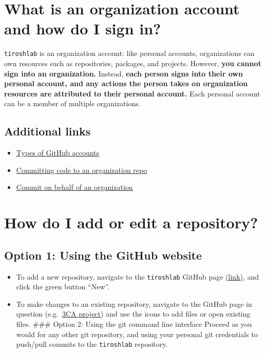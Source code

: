 \documentclass[
]{book}
\providecommand{\tightlist}{%
  \setlength{\itemsep}{0pt}\setlength{\parskip}{0pt}}
\begin{document}
\hypertarget{what-is-an-organization-account-and-how-do-i-sign-in}{%
\section{What is an organization account and how do I sign in?}\label{what-is-an-organization-account-and-how-do-i-sign-in}}

\texttt{tiroshlab} is an organization account: like personal accounts, organizations can own resources such as repositories, packages, and projects. However, \textbf{you cannot sign into an organization.} Instead, \textbf{each person signs into their own personal account, and any actions the person takes on organization resources are attributed to their personal account.} Each personal account can be a member of multiple organizations.

\hypertarget{additional-links}{%
\subsection{Additional links}\label{additional-links}}

\begin{itemize}
\tightlist
\item
  \href{https://docs.github.com/en/get-started/learning-about-github/types-of-github-accounts}{Types of GitHub accounts}
\item
  \href{https://stackoverflow.com/questions/35745358/can-a-github-organization-commit-code-to-a-repository}{Committing code to an organization repo}
\item
  \href{Creating\%20a\%20commit\%20on\%20behalf\%20of\%20an\%20organization}{Commit on behalf of an organization}
\end{itemize}

\hypertarget{how-do-i-add-or-edit-a-repository}{%
\section{How do I add or edit a repository?}\label{how-do-i-add-or-edit-a-repository}}

\hypertarget{option-1-using-the-github-website}{%
\subsection{Option 1: Using the GitHub website}\label{option-1-using-the-github-website}}

\begin{itemize}
\tightlist
\item
  To add a new repository, navigate to the \texttt{tiroshlab} GitHub page \href{https://github.com/tiroshlab}{(link)}, and click the green button ``New''.
\item
  To make changes to an existing repository, navigate to the GitHub page in question (e.g.~\href{https://github.com/tiroshlab/3ca}{3CA project}) and use the icons to add files or open existing files.
  \#\#\# Option 2: Using the git command line interface
  Proceed as you would for any other git repository, and using your personal git credentials to push/pull commits to the \texttt{tiroshlab} repository.
\end{itemize}
\end{document}
